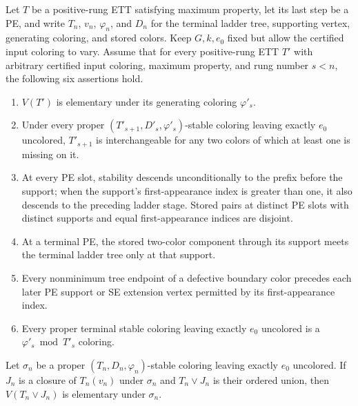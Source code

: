 \begin{lemma}
Let $T$ be a positive-rung ETT satisfying maximum property, let its last
step be a PE, and write $T_n$, $v_n$, $\varphi_n$, and $D_n$ for the
terminal ladder tree, supporting vertex, generating coloring, and stored
colors.  Keep $G,k,e_0$ fixed but allow the certified input coloring to
vary.  Assume that for every positive-rung ETT $T'$ with arbitrary
certified input coloring, maximum property, and rung number $s<n$, the
following six assertions hold.
\begin{enumerate}
\item $V(T')$ is elementary under its generating coloring
$\varphi'_s$.
\item Under every proper $(T'_{s+1},D'_s,\varphi'_s)$-stable coloring
leaving exactly $e_0$ uncolored, $T'_{s+1}$ is interchangeable for any
two colors of which at least one is missing on it.
\item At every PE slot, stability descends unconditionally to the prefix before the
support; when the support's first-appearance index is greater than one, it
also descends to the preceding ladder stage.  Stored pairs at distinct PE slots with distinct supports
and equal first-appearance indices are disjoint.
\item At a terminal PE, the stored two-color component through its
support meets the terminal ladder tree only at that support.
\item Every nonminimum tree endpoint of a defective boundary color
precedes each later PE support or SE extension vertex permitted by its
first-appearance index.
\item Every proper terminal stable coloring leaving exactly $e_0$
uncolored is a $\varphi'_s\bmod T'_s$ coloring.
\end{enumerate}

Let $\sigma_n$ be a proper $(T_n,D_n,\varphi_n)$-stable coloring leaving
exactly $e_0$ uncolored.  If $J_n$ is a closure of $T_n(v_n)$ under
$\sigma_n$ and $T_n\vee J_n$ is their ordered union, then
$V(T_n\vee J_n)$ is elementary under $\sigma_n$.
\end{lemma}
